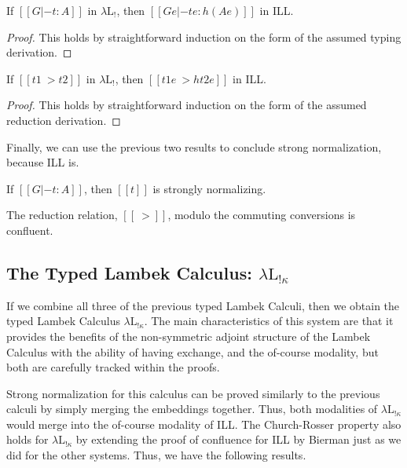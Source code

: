 \documentclass{entcs}
\begin{document}
\begin{lem}
  \label{lemma:type_preserving_embedding_lambdaLk}
  If $[[G |- t : A]]$ in $\lambda\text{L}_!$, then
  $[[G e |- t e : h(A e)]]$ in ILL.
\end{lem}
\begin{proof}
  This holds by straightforward induction on the form of the assumed
  typing derivation.
\end{proof}
\begin{lem}
  \label{lemma:reduction_preserving_embedding_lambdaLk}
  If $[[t1 ~> t2]]$ in $\lambda\text{L}_!$, then $[[t1 e ~> h{t2 e}]]$
  in ILL.
\end{lem}
\begin{proof}
  This holds by straightforward induction on the form of the assumed
  reduction derivation.
\end{proof}
\noindent
Finally, we can use the previous two results to conclude strong
normalization, because ILL is.

\begin{thm}
  \label{corollary:strong_normalization_lambdaLk}
  If $[[G |- t : A]]$, then $[[t]]$ is strongly normalizing.
\end{thm}

\begin{thm}[Confluence]
  \label{thm:confluence-lambdaLk}
  The reduction relation, $[[~>]]$, modulo the commuting conversions
  is confluent.
\end{thm}

\subsection{The Typed Lambek Calculus: $\lambda\text{L}_{!\kappa}$}
\label{subsec:the_typed_lambek_calculus:lambda-l-!kappa}
If we combine all three of the previous typed Lambek Calculi, then we
obtain the typed Lambek Calculus $\lambda\text{L}_{!\kappa}$.  The
main characteristics of this system are that it provides the benefits
of the non-symmetric adjoint structure of the Lambek Calculus with the
ability of having exchange, and the of-course modality, but both are
carefully tracked within the proofs.

Strong normalization for this calculus can be proved similarly to the
previous calculi by simply merging the embeddings together.  Thus,
both modalities of $\lambda\text{L}_{!\kappa}$ would merge into the
of-course modality of ILL.  The Church-Rosser property also holds for
$\lambda\text{L}_{!\kappa}$ by extending the proof of confluence for
ILL by Bierman \cite{Bierman:1994} just as we did for the other
systems.  Thus, we have the following results.
\end{document}
